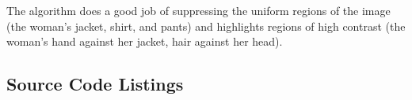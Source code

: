 \documentclass{article}
\begin{document}
\begin{center}
\end{center}
The algorithm does a good job of suppressing the uniform regions of the image (the woman's jacket, shirt, and pants) and highlights regions of high contrast (the woman's hand against her jacket, hair against her head).

\newpage
\begin{appendices}
\section{Source Code Listings}\label{source}
% 







\end{appendices}
\end{document}
